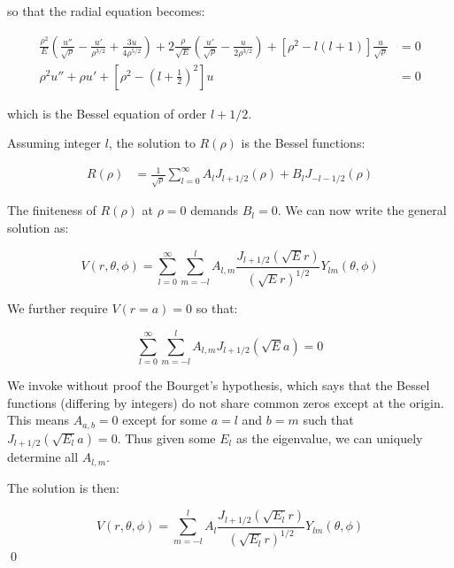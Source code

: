 \documentclass[12pt]{article}
\begin{document}
so that the radial equation becomes:

\begin{equation}
\begin{split}
    \frac{\rho^{2}}{E} \left( \frac{u''}{\sqrt{\rho}} - \frac{u'}{\rho^{3/2}} + \frac{3u}{4\rho^{5/2}} \right) + 2 \frac{\rho}{\sqrt{E}} \left( \frac{u'}{\sqrt{\rho}} - \frac{u}{2\rho^{3/2}} \right) + \left[ \rho^{2} - l(l+1) \right] \frac{u}{\sqrt{\rho}} &= 0 \\
    \rho^{2} u'' + \rho u' + \left[ \rho^{2} - \left( l + \frac{1}{2} \right)^{2} \right] u &= 0
\end{split}
\end{equation}

which is the Bessel equation of order $l + 1/2$.

Assuming integer $l$, the solution to $R(\rho)$ is the Bessel functions:

\begin{equation}
\begin{split}
    R(\rho) &= \frac{1}{\sqrt{\rho}} \sum_{l = 0}^{\infty} A_{l} J_{l + 1/2}(\rho) + B_{l} J_{-l - 1/2}(\rho)
\end{split}
\end{equation}

The finiteness of $R(\rho)$ at $\rho = 0$ demands $B_{l} = 0$. We can now write the general solution as:

\begin{equation}
    V(r, \theta, \phi) = \sum_{l = 0}^{\infty} \sum_{m = -l}^{l} A_{l, m} \frac{J_{l + 1/2}(\sqrt{E}r)}{(\sqrt{E}r)^{1/2}} Y_{lm}(\theta, \phi)
\end{equation}

We further require $V(r = a) = 0$ so that:

\begin{equation}
    \sum_{l = 0}^{\infty} \sum_{m = -l}^{l} A_{l, m} J_{l + 1/2}(\sqrt{E}a) = 0
\end{equation}

We invoke without proof the Bourget's hypothesis, which says that the Bessel functions (differing by integers) do not share common zeros except at the origin. This means $A_{a, b} = 0$ except for some $a = l$ and $b = m$ such that $J_{l + 1/2}(\sqrt{E_{l}}a) = 0$. Thus given some $E_{l}$ as the eigenvalue, we can uniquely determine all $A_{l, m}$.

The solution is then:

\begin{equation}
    V(r, \theta, \phi) = \sum_{m = -l}^{l} A_{l} \frac{J_{l + 1/2}(\sqrt{E_{l}}r)}{(\sqrt{E_{l}}r)^{1/2}} Y_{lm}(\theta, \phi)
\end{equation}
\qed
\end{document}
